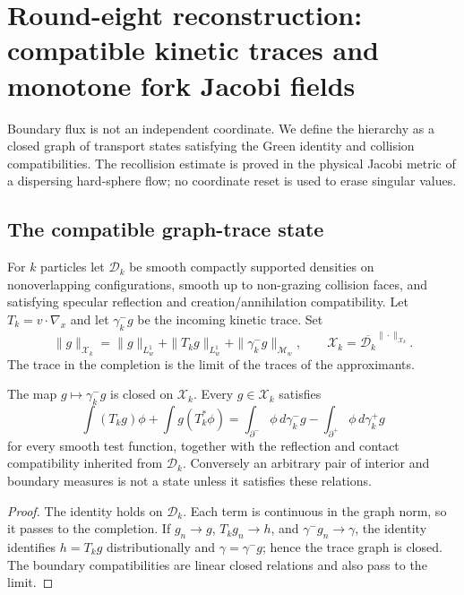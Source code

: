 \section{Round-eight reconstruction: compatible kinetic traces and monotone fork Jacobi fields}
\label{sec:r8-b2}

Boundary flux is not an independent coordinate.  We define the hierarchy as a
closed graph of transport states satisfying the Green identity and collision
compatibilities.  The recollision estimate is proved in the physical Jacobi
metric of a dispersing hard-sphere flow; no coordinate reset is used to erase
singular values.

\subsection{The compatible graph-trace state}

For $k$ particles let $\mathcal D_k$ be smooth compactly supported densities on
nonoverlapping configurations, smooth up to non-grazing collision faces, and
satisfying specular reflection and creation/annihilation compatibility.  Let
$T_k=v\cdot\nabla_x$ and let $\gamma_k^-g$ be the incoming kinetic trace.  Set
\[
 \|g\|_{\mathcal X_k}
 =\|g\|_{L^1_w}+\|T_kg\|_{L^1_w}
 +\|\gamma_k^-g\|_{\mathcal M_w},
\qquad
 \mathcal X_k=\overline{\mathcal D_k}^{\|\cdot\|_{\mathcal X_k}}.
\]
The trace in the completion is the limit of the traces of the approximants.

\begin{lemma}
\label{lem:r8-b2-trace}
The map $g\mapsto\gamma_k^-g$ is closed on $\mathcal X_k$.  Every
$g\in\mathcal X_k$ satisfies
\[
 \int (T_kg)\phi+\int g(T_k^*\phi)
 =\int_{\partial^-}\phi\,d\gamma_k^-g
 -\int_{\partial^+}\phi\,d\gamma_k^+g
\]
for every smooth test function, together with the reflection and contact
compatibility inherited from $\mathcal D_k$.  Conversely an arbitrary pair of
interior and boundary measures is not a state unless it satisfies these
relations.
\end{lemma}

\begin{proof}
The identity holds on $\mathcal D_k$.  Each term is continuous in the graph
norm, so it passes to the completion.  If $g_n\to g$, $T_kg_n\to h$, and
$\gamma^-g_n\to\gamma$, the identity identifies $h=T_kg$ distributionally and
$\gamma=\gamma^-g$; hence the trace graph is closed.  The boundary
compatibilities are linear closed relations and also pass to the limit.
\end{proof}

